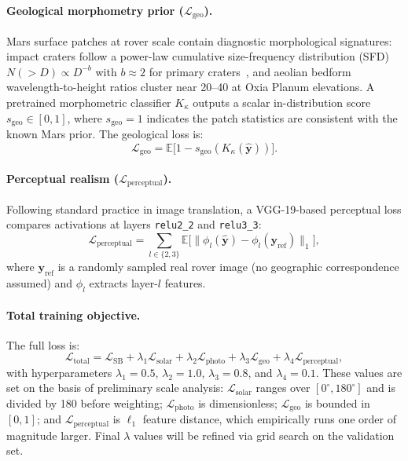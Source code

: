 \documentclass[10pt,journal]{IEEEtran}
\begin{document}
\paragraph{Geological morphometry prior ($\mathcal{L}_{\mathrm{geo}}$).}
Mars surface patches at rover scale contain diagnostic morphological
signatures: impact craters follow a power-law cumulative size-frequency
distribution (SFD) $N(>D) \propto D^{-b}$ with $b \approx 2$ for primary
craters~\cite{tao2021madnet}, and aeolian bedform wavelength-to-height ratios
cluster near 20--40 at Oxia Planum elevations. A pretrained morphometric
classifier $K_\kappa$ outputs a scalar in-distribution score $s_{\mathrm{geo}}
\in [0, 1]$, where $s_{\mathrm{geo}} = 1$ indicates the patch statistics are
consistent with the known Mars prior. The geological loss is:
\begin{equation}
  \mathcal{L}_{\mathrm{geo}} = \mathbb{E}\bigl[1 - s_{\mathrm{geo}}(K_\kappa(\hat{\mathbf{y}}))\bigr].
  \label{eq:l_geo}
\end{equation}

\paragraph{Perceptual realism ($\mathcal{L}_{\mathrm{perceptual}}$).}
Following standard practice in image translation, a VGG-19-based perceptual
loss \cite{catalano2025inpainting} compares activations at layers
\texttt{relu2\_2} and \texttt{relu3\_3}:
\begin{equation}
  \mathcal{L}_{\mathrm{perceptual}} =
    \sum_{l \in \{2,3\}}
    \mathbb{E}\bigl[\|\phi_l(\hat{\mathbf{y}}) - \phi_l(\mathbf{y}_{\mathrm{ref}})\|_1\bigr],
  \label{eq:l_perc}
\end{equation}
where $\mathbf{y}_{\mathrm{ref}}$ is a randomly sampled real rover image (no
geographic correspondence assumed) and $\phi_l$ extracts layer-$l$ features.

\paragraph{Total training objective.}
The full loss is:
\begin{equation}
  \mathcal{L}_{\mathrm{total}} =
    \mathcal{L}_{\mathrm{SB}}
    + \lambda_1 \mathcal{L}_{\mathrm{solar}}
    + \lambda_2 \mathcal{L}_{\mathrm{photo}}
    + \lambda_3 \mathcal{L}_{\mathrm{geo}}
    + \lambda_4 \mathcal{L}_{\mathrm{perceptual}},
  \label{eq:l_total}
\end{equation}
with hyperparameters $\lambda_1 = 0.5$, $\lambda_2 = 1.0$, $\lambda_3 = 0.8$,
and $\lambda_4 = 0.1$. These values are set on the basis of preliminary
scale analysis: $\mathcal{L}_{\mathrm{solar}}$ ranges over
$[0^{\circ}, 180^{\circ}]$ and is divided by 180 before weighting;
$\mathcal{L}_{\mathrm{photo}}$ is dimensionless; $\mathcal{L}_{\mathrm{geo}}$
is bounded in $[0, 1]$; and $\mathcal{L}_{\mathrm{perceptual}}$ is $\ell_1$
feature distance, which empirically runs one order of magnitude larger.
Final $\lambda$ values will be refined via grid search on the validation set.
\end{document}

